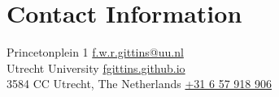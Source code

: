 \section{Contact Information}

Princetonplein 1                    
\hfill \href{mailto:f.w.r.gittins@uu.nl}{f.w.r.gittins@uu.nl} \\
Utrecht University                  
\hfill \href{https://fgittins.github.io}{fgittins.github.io} \\
3584 CC Utrecht, The Netherlands    
\hfill \href{tel:+31 6 57 918 906}{+31 6 57 918 906}


